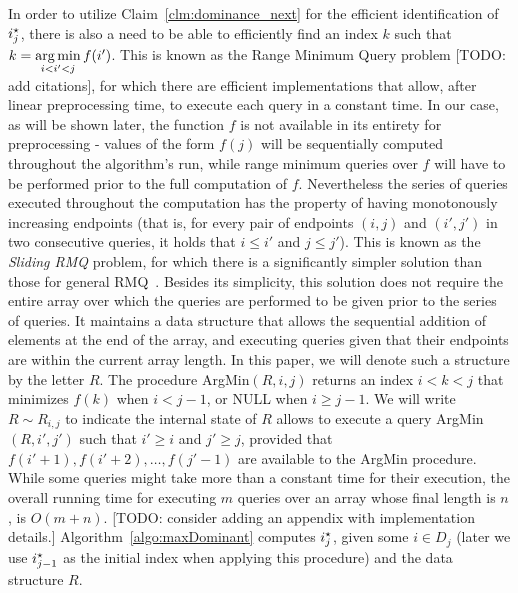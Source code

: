 In order to utilize Claim~\ref{clm:dominance_next} for the efficient identification of $\optIx$, there is also a need to be able to efficiently find an index $k$ such that $k = \argmin\limits_{i < i' < j} f(i')$. This is known as the Range Minimum Query problem [TODO: add citations], for which there are efficient implementations that allow, after linear preprocessing time, to execute each query in a constant time. In our case, as will be shown later, the function $f$ is not available in its entirety for preprocessing - values of the form $f(j)$ will be sequentially computed throughout the algorithm's run, while range minimum queries over $f$ will have to be performed prior to the full computation of $f$. Nevertheless the series of queries executed throughout the computation has the property of having monotonously increasing endpoints (that is, for every pair of endpoints $(i, j)$ and $(i', j')$ in two consecutive queries, it holds that $i \leq i'$ and $j \leq j'$). This is known as the \emph{Sliding RMQ} problem, for which there is a significantly simpler solution than those for general RMQ~\cite{lee2007simple}. Besides its simplicity, this solution does not require the entire array over which the queries are performed to be given prior to the series of queries. It maintains a data structure that allows the sequential addition of elements at the end of the array, and executing queries given that their endpoints are within the current array length. In this paper, we will denote such a structure by the letter $R$. The procedure ArgMin$(R, i, j)$ returns an index $i < k < j$ that minimizes $f(k)$ when $i < j-1$, or NULL when $i \geq j-1$. We will write $R \sim R_{i, j}$ to indicate the internal state of $R$ allows to execute a query ArgMin$(R, i', j')$ such that $i' \geq i$ and $j' \geq j$, provided that $f(i'+1), f(i'+2), \ldots, f(j'-1)$ are available to the ArgMin procedure.
While some queries might take more than a constant time for their execution, the overall running time for executing $m$ queries over an array whose final length is $n$, is $O(m+n)$. 
[TODO: consider adding an appendix with implementation details.] 
Algorithm~\ref{algo:maxDominant} computes $\optIx$, given some $i \in D_j$ (later we use $\optIx[j-1]$ as the initial index when applying this procedure) and the data structure $R$.


